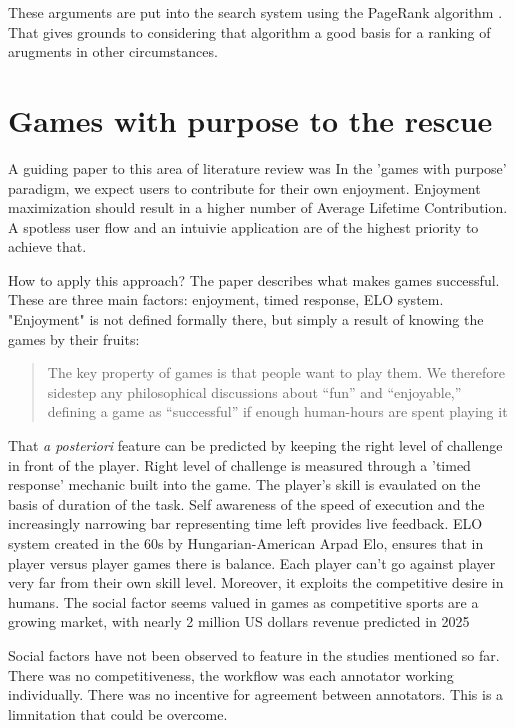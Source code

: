 \documentclass{report}
\begin{document}
{These arguments are put into the search system using the PageRank algorithm \cite{brin_anatomy_1998}.  That gives grounds to considering that algorithm a good basis for a ranking of arugments in other circumstances.

\section{Games with purpose to the rescue}
A guiding paper to this area of literature review was \cite{von_ahn_designing_2008} 
In the 'games with purpose' paradigm, we expect users to contribute for their own enjoyment. Enjoyment maximization should result in a higher number of Average Lifetime Contribution.  A spotless user flow and an intuivie application are of the highest priority to achieve that.

How to apply this approach? The paper describes what makes games successful.
These are three main factors: enjoyment, timed response, ELO system.
"Enjoyment" is not defined formally there, but simply a result of knowing the games by their fruits:

\begin{quote}
 The key property of games is that people want to play them. We therefore sidestep any philosophical discussions about “fun” and “enjoyable,” defining a game as “successful” if enough human-hours are spent playing it
\end{quote}
That  \textit{a posteriori} feature can be predicted by keeping the right level of challenge in front of the player.  \cite{locke_theory_1991}
Right level of challenge is measured through a 'timed response' mechanic built into the game.
The player's skill is evaulated on the basis of duration of the task. 
Self awareness of the speed of execution and the increasingly narrowing bar representing time left provides live feedback.
ELO system \cite{noauthor_elo_2023} created in the 60s by Hungarian-American Arpad Elo, ensures that in player versus player games there is balance. Each player can't go against player very far from their own skill level.
Moreover, it exploits the competitive desire in humans.
The social factor seems valued in games as competitive sports are a growing market, with nearly 2 million US dollars revenue predicted \cite{noauthor_global_nodate} in 2025

Social factors have not been observed to feature in the studies mentioned so far.
There was no competitiveness, the workflow was each annotator working individually.
There was no incentive for agreement between annotators.
This is a limnitation that could be overcome.

}
\end{document}
